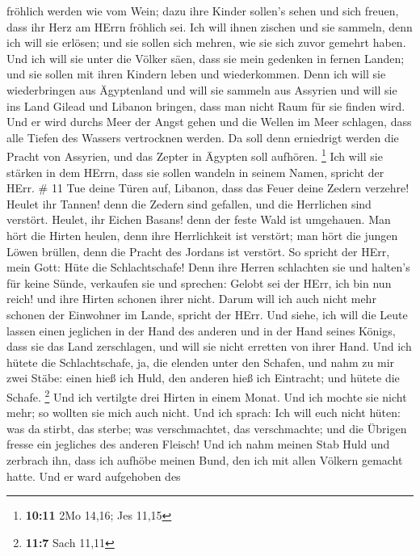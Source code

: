 fröhlich werden wie vom Wein; dazu ihre Kinder sollen's sehen und sich
freuen, dass ihr Herz am HErrn fröhlich sei.  Ich will ihnen
zischen und sie sammeln, denn ich will sie erlösen; und sie sollen sich
mehren, wie sie sich zuvor gemehrt haben.  Und ich will sie
unter die Völker säen, dass sie mein gedenken in fernen Landen; und sie
sollen mit ihren Kindern leben und wiederkommen.  Denn ich
will sie wiederbringen aus Ägyptenland und will sie sammeln aus Assyrien
und will sie ins Land Gilead und Libanon bringen, dass man nicht Raum
für sie finden wird.  Und er wird durchs Meer der Angst
gehen und die Wellen im Meer schlagen, dass alle Tiefen des Wassers
vertrocknen werden. Da soll denn erniedrigt werden die Pracht von
Assyrien, und das Zepter in Ägypten soll aufhören. \footnote{\textbf{10:11}
  2Mo 14,16; Jes 11,15}  Ich will sie stärken in dem HErrn,
dass sie sollen wandeln in seinem Namen, spricht der HErr. \# 11
 Tue deine Türen auf, Libanon, dass das Feuer deine Zedern
verzehre!  Heulet ihr Tannen! denn die Zedern sind gefallen,
und die Herrlichen sind verstört. Heulet, ihr Eichen Basans! denn der
feste Wald ist umgehauen.  Man hört die Hirten heulen, denn
ihre Herrlichkeit ist verstört; man hört die jungen Löwen brüllen, denn
die Pracht des Jordans ist verstört.  So spricht der HErr,
mein Gott: Hüte die Schlachtschafe!  Denn ihre Herren
schlachten sie und halten's für keine Sünde, verkaufen sie und sprechen:
Gelobt sei der HErr, ich bin nun reich! und ihre Hirten schonen ihrer
nicht.  Darum will ich auch nicht mehr schonen der Einwohner
im Lande, spricht der HErr. Und siehe, ich will die Leute lassen einen
jeglichen in der Hand des anderen und in der Hand seines Königs, dass
sie das Land zerschlagen, und will sie nicht erretten von ihrer Hand.
 Und ich hütete die Schlachtschafe, ja, die elenden unter
den Schafen, und nahm zu mir zwei Stäbe: einen hieß ich Huld, den
anderen hieß ich Eintracht; und hütete die Schafe. \footnote{\textbf{11:7}
  Sach 11,11}  Und ich vertilgte drei Hirten in einem Monat.
Und ich mochte sie nicht mehr; so wollten sie mich auch nicht.
 Und ich sprach: Ich will euch nicht hüten: was da stirbt,
das sterbe; was verschmachtet, das verschmachte; und die Übrigen fresse
ein jegliches des anderen Fleisch!  Und ich nahm meinen
Stab Huld und zerbrach ihn, dass ich aufhöbe meinen Bund, den ich mit
allen Völkern gemacht hatte.  Und er ward aufgehoben des
